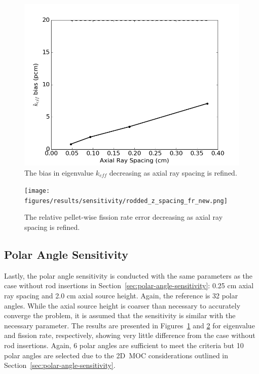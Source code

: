 \begin{figure}[h!]
	\centering
	\includegraphics[width=0.7\linewidth]{figures/results/sensitivity/rodded_z_spacing_pcm.png}
	\caption[]{The bias in eigenvalue $k_{\textit{eff}}$ decreasing as axial ray spacing is refined.}
	\label{fig:rodded-axial-rs-pcm}
\end{figure}
\begin{figure}[h!]
	\centering
	\texttt{[image: figures/results/sensitivity/rodded\_z\_spacing\_fr\_new.png]}
	\caption[]{The relative pellet-wise fission rate error decreasing as axial ray spacing is refined.}
	\label{fig:rodded-axial-rs-fr}
\end{figure}

\subsection{Polar Angle Sensitivity}

Lastly, the polar angle sensitivity is conducted with the same parameters as the case without rod insertions in Section~\ref{sec:polar-angle-sensitivity}: 0.25 cm axial ray spacing and 2.0 cm axial source height. Again, the reference is 32 polar angles. While the axial source height is coarser than necessary to accurately converge the problem, it is assumed that the sensitivity is similar with the necessary parameter. The results are presented in Figures~\ref{fig:rodded-axial-rs-pcm} and \ref{fig:rodded-axial-rs-fr} for eigenvalue and fission rate, respectively, showing very little difference from the case without rod insertions. Again, 6 polar angles are sufficient to meet the criteria but 10 polar angles are selected due to the 2D~\ac{MOC} considerations outlined in Section~\ref{sec:polar-angle-sensitivity}.

